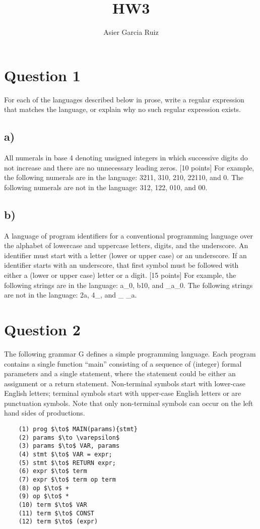 \documentclass{article}
\title{HW3}
\author{Asier Garcia Ruiz}
\begin{document}
\maketitle

\section*{Question 1}
For each of the languages described below in prose, write a regular expression
that matches the language, or explain why no such regular expression exists.

\subsection*{a)}
All numerals in base 4 denoting unsigned integers in which successive digits do not
increase and there are no unnecessary leading zeros. [10 points]
For example, the following numerals are in the language: 3211, 310, 210,
22110, and 0. The following numerals are not in the language: 312, 122, 010, and 00.

\subsection*{b)}
A language of program identifiers for a conventional programming language over
the alphabet of lowercase and uppercase letters, digits, and the underscore.
An identifier must start with a letter (lower or upper case) or an underscore.
If an identifier starts with an underscore, that first symbol must be followed
with either a (lower or upper case) letter or a digit. [15 points]
For example, the following strings are in the language: a\_0, b10, and \_a\_0.
The following strings are not in the language: 2a, 4\_, and \_ \_a.

\section*{Question 2}
The following grammar G defines a simple programming language. Each program contains
a single function “main” consisting of a sequence of (integer) formal parameters
and a single statement, where the statement could be either an assignment or a return
statement. Non-terminal symbols start with lower-case English letters; terminal
symbols start with upper-case English letters or are punctuation symbols. Note
that only non-terminal symbols can occur on the left hand sides of productions.

\begin{lstlisting}
    (1) prog $\to$ MAIN(params){stmt}
    (2) params $\to \varepsilon$
    (3) params $\to$ VAR, params
    (4) stmt $\to$ VAR = expr;
    (5) stmt $\to$ RETURN expr;
    (6) expr $\to$ term
    (7) expr $\to$ term op term 
    (8) op $\to$ +
    (9) op $\to$ *
    (10) term $\to$ VAR
    (11) term $\to$ CONST
    (12) term $\to$ (expr)
\end{lstlisting}
\end{document}
